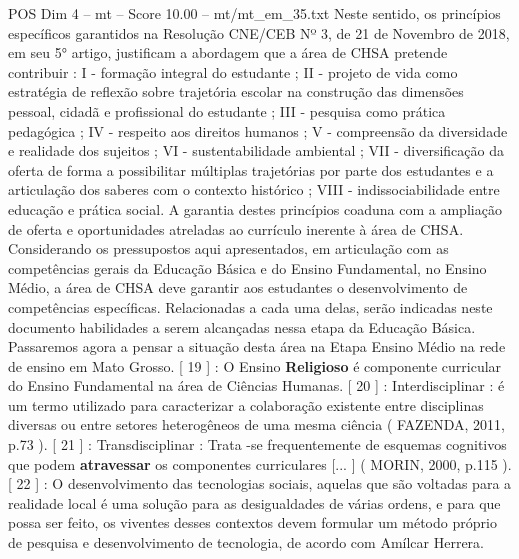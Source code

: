 \begin{textsample}{POS Dim 4 – mt – Score 10.00 – mt/mt\_em\_35.txt}
Neste sentido, os princípios específicos garantidos na Resolução CNE/CEB Nº 3, de 21 de Novembro de 2018, em seu 5{\EmojiFont °} artigo, justificam a abordagem que a área de CHSA pretende contribuir : I - formação integral do estudante ; II - projeto de vida como estratégia de reflexão sobre trajetória escolar na construção das dimensões pessoal, cidadã e profissional do estudante ; III - pesquisa como prática pedagógica ; IV - respeito aos direitos humanos ; V - compreensão da diversidade e realidade dos sujeitos ; VI - sustentabilidade ambiental ; VII - diversificação da oferta de forma a possibilitar múltiplas trajetórias por parte dos estudantes e a articulação dos saberes com o contexto histórico ; VIII - indissociabilidade entre educação e prática social.
A garantia destes princípios coaduna com a ampliação de oferta e oportunidades atreladas ao currículo inerente à área de CHSA.
Considerando os pressupostos aqui apresentados, em articulação com as competências gerais da Educação Básica e do Ensino Fundamental, no Ensino Médio, a área de CHSA deve garantir aos estudantes o desenvolvimento de competências específicas.
Relacionadas a cada uma delas, serão indicadas neste documento habilidades a serem alcançadas nessa etapa da Educação Básica.
Passaremos agora a pensar a situação desta área na Etapa Ensino Médio na rede de ensino em Mato Grosso. [ 19 ] : O Ensino \textbf{Religioso} é componente curricular do Ensino Fundamental na área de Ciências Humanas. [ 20 ] : Interdisciplinar : é um termo utilizado para caracterizar a colaboração existente entre disciplinas diversas ou entre setores heterogêneos de uma mesma ciência ( FAZENDA, 2011, p.73 ). [ 21 ] : Transdisciplinar : Trata -se frequentemente de esquemas cognitivos que podem \textbf{atravessar} os componentes curriculares [... ] ( MORIN, 2000, p.115 ). [ 22 ] : O desenvolvimento das tecnologias sociais, aquelas que são voltadas para a realidade local é uma solução para as desigualdades de várias ordens, e para que possa ser feito, os viventes desses contextos devem formular um método próprio de pesquisa e desenvolvimento de tecnologia, de acordo com Amílcar Herrera.

\end{textsample}
